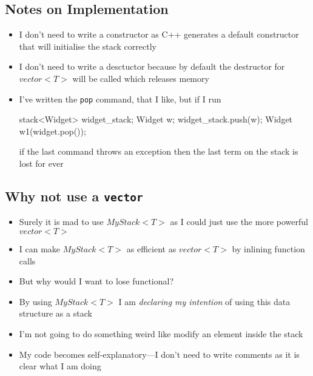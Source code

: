 \begin{slide}
\section[-1]{Notes on Implementation}

\begin{PauseHighLight}
  \begin{itemize}
  \item I don't need to write a constructor as C++ generates a default
    constructor that will initialise the stack correctly\pause
  \item I don't need to write a desctuctor because by default the
    destructor for \jl$vector<T>$ will be called which releases
    memory\pause
  \item I've written the \texttt{pop} command, that I like, but if I
    run
    \begin{cpp}
      stack<Widget> widget_stack;
      Widget w;
      widget_stack.push(w);
      Widget w1(widget.pop());
    \end{cpp}
    if the last command throws an exception then the last term on the
    stack is lost for ever\pause
  \end{itemize}
\end{PauseHighLight}

\end{slide}


\begin{slide}
\section[-2]{Why not use a \texttt{vector}}
  
\begin{PauseHighLight}
  \begin{itemize}
  \item Surely it is mad to use \jl$MyStack<T>$ as I could just use
    the more powerful \jl$vector<T>$\pause
  \item I can make \jl$MyStack<T>$ as efficient as \jl$vector<T>$ by
    inlining function calls\pause
  \item But why would I want to lose functional?\pause
  \item By using \jl$MyStack<T>$ I am \emph{declaring my intention} of using
    this data structure as a stack\pause
  \item I'm not going to do something weird like modify an element
    inside the stack\pause
  \item My code becomes self-explanatory\pause---I don't need to write
    comments as it is clear what I am doing\pauseb
  \end{itemize}
\end{PauseHighLight}

\end{slide}


